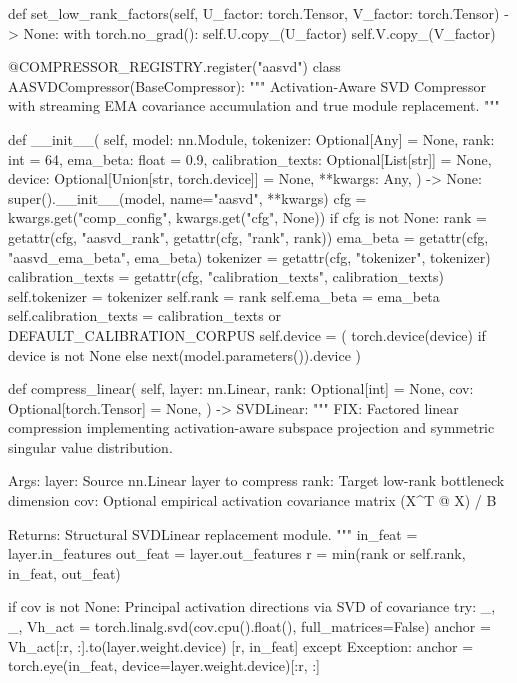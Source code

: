     def set\_low\_rank\_factors(self, U\_factor: torch.Tensor, V\_factor: torch.Tensor) -> None:
        with torch.no\_grad():
            self.U.copy\_(U\_factor)
            self.V.copy\_(V\_factor)


@COMPRESSOR\_REGISTRY.register("aasvd")
class AASVDCompressor(BaseCompressor):
    """
    Activation-Aware SVD Compressor with streaming EMA covariance accumulation
    and true module replacement.
    """

    def \_\_init\_\_(
        self,
        model: nn.Module,
        tokenizer: Optional[Any] = None,
        rank: int = 64,
        ema\_beta: float = 0.9,
        calibration\_texts: Optional[List[str]] = None,
        device: Optional[Union[str, torch.device]] = None,
        **kwargs: Any,
    ) -> None:
        super().\_\_init\_\_(model, name="aasvd", **kwargs)
        cfg = kwargs.get("comp\_config", kwargs.get("cfg", None))
        if cfg is not None:
            rank = getattr(cfg, "aasvd\_rank", getattr(cfg, "rank", rank))
            ema\_beta = getattr(cfg, "aasvd\_ema\_beta", ema\_beta)
            tokenizer = getattr(cfg, "tokenizer", tokenizer)
            calibration\_texts = getattr(cfg, "calibration\_texts", calibration\_texts)
        self.tokenizer = tokenizer
        self.rank = rank
        self.ema\_beta = ema\_beta
        self.calibration\_texts = calibration\_texts or DEFAULT\_CALIBRATION\_CORPUS
        self.device = (
            torch.device(device)
            if device is not None
            else next(model.parameters()).device
        )

    def compress\_linear(
        self,
        layer: nn.Linear,
        rank: Optional[int] = None,
        cov: Optional[torch.Tensor] = None,
    ) -> SVDLinear:
        """
        FIX: Factored linear compression implementing activation-aware subspace projection
        and symmetric singular value distribution.
        
        Args:
            layer: Source nn.Linear layer to compress
            rank: Target low-rank bottleneck dimension
            cov: Optional empirical activation covariance matrix (X^T @ X) / B
            
        Returns:
            Structural SVDLinear replacement module.
        """
        in\_feat = layer.in\_features
        out\_feat = layer.out\_features
        r = min(rank or self.rank, in\_feat, out\_feat)

        if cov is not None:
             Principal activation directions via SVD of covariance
            try:
                \_, \_, Vh\_act = torch.linalg.svd(cov.cpu().float(), full\_matrices=False)
                anchor = Vh\_act[:r, :].to(layer.weight.device)   [r, in\_feat]
            except Exception:
                anchor = torch.eye(in\_feat, device=layer.weight.device)[:r, :]

